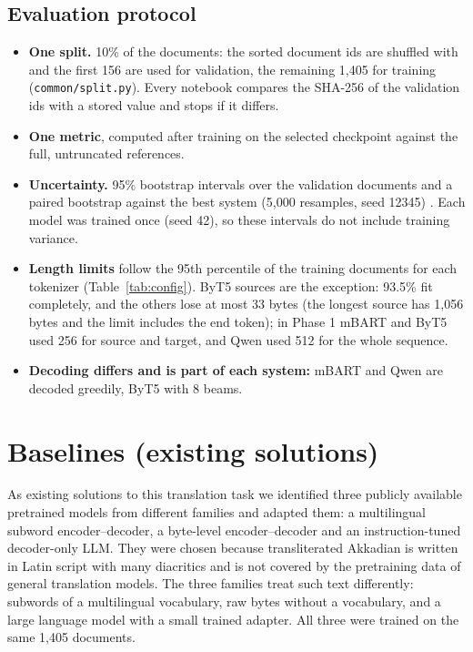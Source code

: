 \documentclass[a4paper,12pt]{article}
\begin{document}
\subsection{Evaluation protocol}
\label{sec:protocol}
\begin{itemize}
    \item \textbf{One split.} 10\% of the documents: the sorted document ids are shuffled with  and the first 156 are used for validation, the remaining 1{,}405 for training (\texttt{common/split.py}). Every notebook compares the SHA-256 of the validation ids with a stored value and stops if it differs.
    \item \textbf{One metric}, computed after training on the selected checkpoint against the full, untruncated references.
    \item \textbf{Uncertainty.} 95\% bootstrap intervals over the validation documents and a paired bootstrap against the best system (5{,}000 resamples, seed 12345) \cite{koehn}. Each model was trained once (seed 42), so these intervals do not include training variance.
    \item \textbf{Length limits} follow the 95th percentile of the training documents for each tokenizer (Table~\ref{tab:config}). ByT5 sources are the exception: 93.5\% fit completely, and the others lose at most 33 bytes (the longest source has 1{,}056 bytes and the limit includes the end token); in Phase 1 mBART and ByT5 used 256 for source and target, and Qwen used 512 for the whole sequence.
    \item \textbf{Decoding differs and is part of each system:} mBART and Qwen are decoded greedily, ByT5 with 8 beams.
\end{itemize}

\section{Baselines (existing solutions)}
\label{sec:baselines}

As existing solutions to this translation task we identified three publicly available pretrained models from different families and adapted them: a multilingual subword encoder--decoder, a byte-level encoder--decoder and an instruction-tuned decoder-only LLM. They were chosen because transliterated Akkadian is written in Latin script with many diacritics and is not covered by the pretraining data of general translation models. The three families treat such text differently: subwords of a multilingual vocabulary, raw bytes without a vocabulary, and a large language model with a small trained adapter. All three were trained on the same 1{,}405 documents.
\end{document}
